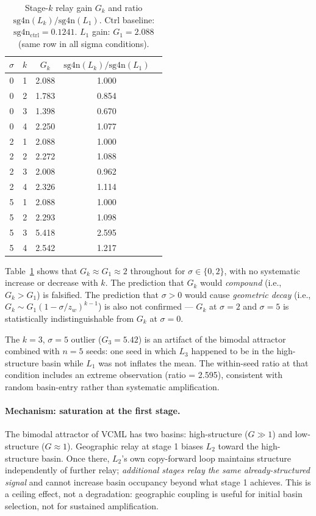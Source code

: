 \documentclass[11pt]{article}
\begin{document}
\begin{table}[h]
  \centering
  \caption{Stage-$k$ relay gain $G_k$ and ratio $\mathrm{sg4n}(L_k)/\mathrm{sg4n}(L_1)$.
           Ctrl baseline: $\mathrm{sg4n_{ctrl}} = 0.1241$.
           $L_1$ gain: $G_1 = 2.088$ (same row in all sigma conditions).}
  \label{tab:chain}
  \small
  \begin{tabular}{ccccc}
    \toprule
    $\sigma$ & $k$ & $G_k$ & $\mathrm{sg4n}(L_k)/\mathrm{sg4n}(L_1)$ \\
    \midrule
    0 & 1 & 2.088 & 1.000 \\
    0 & 2 & 1.783 & 0.854 \\
    0 & 3 & 1.398 & 0.670 \\
    0 & 4 & 2.250 & 1.077 \\
    \midrule
    2 & 1 & 2.088 & 1.000 \\
    2 & 2 & 2.272 & 1.088 \\
    2 & 3 & 2.008 & 0.962 \\
    2 & 4 & 2.326 & 1.114 \\
    \midrule
    5 & 1 & 2.088 & 1.000 \\
    5 & 2 & 2.293 & 1.098 \\
    5 & 3 & 5.418 & 2.595 \\
    5 & 4 & 2.542 & 1.217 \\
    \bottomrule
  \end{tabular}
\end{table}

Table~\ref{tab:chain} shows that $G_k \approx G_1 \approx 2$ throughout for
$\sigma \in \{0, 2\}$, with no systematic increase or decrease with $k$.
The prediction that $G_k$ would \emph{compound} (i.e., $G_k > G_1$) is falsified.
The prediction that $\sigma > 0$ would cause \emph{geometric decay} (i.e.,
$G_k \sim G_1 (1 - \sigma/z_w)^{k-1}$) is also not confirmed --- $G_k$ at
$\sigma=2$ and $\sigma=5$ is statistically indistinguishable from $G_k$ at $\sigma=0$.

The $k=3$, $\sigma=5$ outlier ($G_3 = 5.42$) is an artifact of the bimodal
attractor combined with $n=5$ seeds: one seed in which $L_3$ happened to be
in the high-structure basin while $L_1$ was not inflates the mean.
The within-seed ratio at that condition includes an extreme observation
(ratio = 2.595), consistent with random basin-entry rather than systematic amplification.

\paragraph{Mechanism: saturation at the first stage.}
The bimodal attractor of VCML has two basins: high-structure ($G \gg 1$) and
low-structure ($G \approx 1$).
Geographic relay at stage 1 biases $L_2$ toward the high-structure basin.
Once there, $L_2$'s own copy-forward loop maintains structure independently
of further relay; \emph{additional stages relay the same already-structured
signal} and cannot increase basin occupancy beyond what stage 1 achieves.
This is a ceiling effect, not a degradation: geographic coupling is useful for
initial basin selection, not for sustained amplification.
\end{document}
